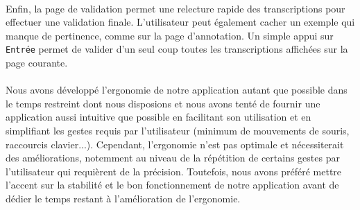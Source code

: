 \paragraph{}
Enfin, la page de validation permet une relecture rapide des transcriptions pour effectuer une validation finale. L'utilisateur peut également cacher un exemple qui manque de pertinence, comme sur la page d'annotation. Un simple appui sur \texttt{Entrée} permet de valider d'un seul coup toutes les transcriptions affichées sur la page courante.

\paragraph{}
Nous avons développé l'ergonomie de notre application autant que possible dans le temps restreint dont nous disposions et nous avons tenté de fournir une application aussi intuitive que possible en facilitant son utilisation et en simplifiant les gestes requis par l'utilisateur (minimum de mouvements de souris, raccourcis clavier...). Cependant, l'ergonomie n'est pas optimale et nécessiterait des améliorations, notemment au niveau de la répétition de certains gestes par l'utilisateur qui requièrent de la précision. Toutefois, nous avons préféré mettre l'accent sur la stabilité et le bon fonctionnement de notre application avant de dédier le temps restant à l'amélioration de l'ergonomie.

